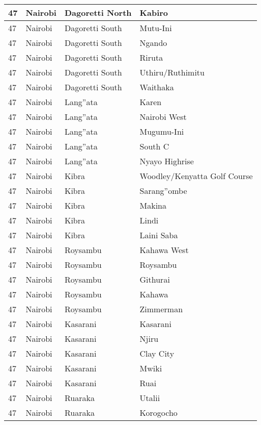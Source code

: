 \begin{table}[!ht]
\begin{tabular}{|l|l|l|l|}
        47 & Nairobi & Dagoretti North & Kabiro \\ \hline
        47 & Nairobi & Dagoretti South & Mutu-Ini \\ \hline
        47 & Nairobi & Dagoretti South & Ngando \\ \hline
        47 & Nairobi & Dagoretti South & Riruta \\ \hline
        47 & Nairobi & Dagoretti South & Uthiru/Ruthimitu \\ \hline
        47 & Nairobi & Dagoretti South & Waithaka \\ \hline
        47 & Nairobi & Lang''ata & Karen \\ \hline
        47 & Nairobi & Lang''ata & Nairobi West \\ \hline
        47 & Nairobi & Lang''ata & Mugumu-Ini \\ \hline
        47 & Nairobi & Lang''ata & South C \\ \hline
        47 & Nairobi & Lang''ata & Nyayo Highrise \\ \hline
        47 & Nairobi & Kibra & Woodley/Kenyatta Golf Course \\ \hline
        47 & Nairobi & Kibra & Sarang''ombe \\ \hline
        47 & Nairobi & Kibra & Makina \\ \hline
        47 & Nairobi & Kibra & Lindi \\ \hline
        47 & Nairobi & Kibra & Laini Saba \\ \hline
        47 & Nairobi & Roysambu & Kahawa West \\ \hline
        47 & Nairobi & Roysambu & Roysambu \\ \hline
        47 & Nairobi & Roysambu & Githurai \\ \hline
        47 & Nairobi & Roysambu & Kahawa \\ \hline
        47 & Nairobi & Roysambu & Zimmerman \\ \hline
        47 & Nairobi & Kasarani & Kasarani \\ \hline
        47 & Nairobi & Kasarani & Njiru \\ \hline
        47 & Nairobi & Kasarani & Clay City \\ \hline
        47 & Nairobi & Kasarani & Mwiki \\ \hline
        47 & Nairobi & Kasarani & Ruai \\ \hline
        47 & Nairobi & Ruaraka & Utalii \\ \hline
        47 & Nairobi & Ruaraka & Korogocho \\ \hline

\end{tabular}
\end{table}
